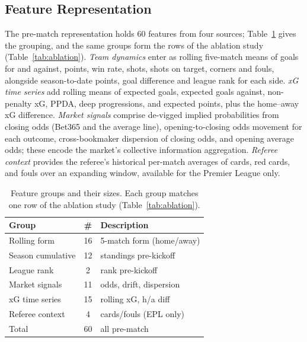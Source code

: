 \documentclass[10pt]{article}
\begin{document}
\subsection{Feature Representation}
\label{sec:features}
The pre-match representation holds 60 features from four sources; Table~\ref{tab:feat}
gives the grouping, and the same groups form the rows of the ablation study
(Table~\ref{tab:ablation}). \emph{Team dynamics} enter as rolling five-match
means of goals for and against, points, win rate, shots, shots on target, corners
and fouls, alongside season-to-date points, goal difference and league rank for
each side.
\emph{xG time series} add rolling means of expected goals, expected goals
against, non-penalty xG, PPDA, deep progressions, and expected points, plus the
home--away xG difference. \emph{Market signals} comprise de-vigged implied
probabilities from closing odds (Bet365 and the average line),
opening-to-closing odds movement for each outcome, cross-bookmaker dispersion
of closing odds, and opening average odds; these encode the market's collective
information aggregation. \emph{Referee context} provides the referee's
historical per-match averages of cards, red cards, and fouls over an expanding
window, available for the Premier League only.

\begin{table}[htbp]
\centering
\caption{Feature groups and their sizes. Each group matches one row of the
ablation study (Table~\ref{tab:ablation}).}
\label{tab:feat}
\small
\setlength{\tabcolsep}{4pt}
\begin{tabular}{lcl}
\toprule
Group & \# & Description \\
\midrule
Rolling form & 16 & 5-match form (home/away) \\
Season cumulative & 12 & standings pre-kickoff \\
League rank & 2 & rank pre-kickoff \\
Market signals & 11 & odds, drift, dispersion \\
xG time series & 15 & rolling xG, h/a diff \\
Referee context & 4 & cards/fouls (EPL only) \\
\midrule
Total & 60 & all pre-match \\
\bottomrule
\end{tabular}
\end{table}
\end{document}
